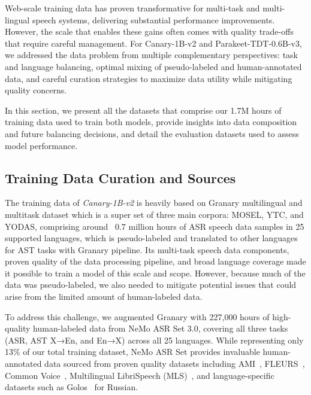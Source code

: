 \label{sec:data}

Web-scale training data has proven transformative for multi-task and multi-lingual speech systems, delivering substantial performance improvements. However, the scale that enables these gains often comes with quality trade-offs that require careful management. For Canary-1B-v2 and Parakeet-TDT-0.6B-v3, we addressed the data problem from multiple complementary perspectives: task and language balancing, optimal mixing of pseudo-labeled and human-annotated data, and careful curation strategies to maximize data utility while mitigating quality concerns. 

In this section, we present all the datasets that comprise our 1.7M hours of training data used to train both models, provide insights into data composition and future balancing decisions, and detail the evaluation datasets used to assess model performance.


\subsection{Training Data Curation and Sources }
\label{sec:data-training-data}

The training data of \emph{Canary-1B-v2} is heavily based on Granary multilingual and multitask dataset \cite{granary} which is a super set of three main corpora: MOSEL\cite{mosel}, YTC\cite{ytc}, and YODAS\cite{yodas}, comprising around ~0.7 million hours of ASR speech data samples in 25 supported languages, which is pseudo-labeled and translated to other languages for AST tasks with Granary pipeline. Its multi-task speech data components, proven quality of the data processing pipeline, and broad language coverage made it possible to train a model of this scale and scope. However, because much of the data was pseudo-labeled, we also needed to mitigate potential issues that could arise from the limited amount of human-labeled data.

To address this challenge, we augmented Granary with 227,000 hours of high-quality human-labeled data from NeMo ASR Set 3.0, covering all three tasks (ASR, AST X→En, and En→X) across all 25 languages. While representing only 13\% of our total training dataset, NeMo ASR Set provides invaluable human-annotated data sourced from proven quality datasets including AMI~\cite{ami}, FLEURS~\cite{fleurs}, Common Voice~\cite{commonvoice:2020}, Multilingual LibriSpeech (MLS)~\cite{MLS}, and language-specific datasets such as Golos~\cite{golos} for Russian. 


